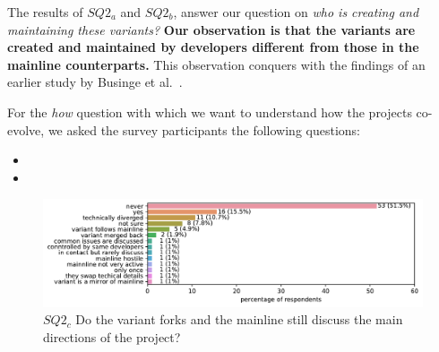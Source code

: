 The results of $SQ2_{a}$ and $SQ2_{b}$, answer our question on \textit{who is creating and maintaining these variants?} \textbf{Our observation is that the variants are created and maintained by developers different from those in the mainline counterparts.} This observation conquers with the findings of an earlier study by Businge et al.~\cite{businge:emse:2021}.


For the \textit{how} question with which we want to understand how the projects co-evolve, we asked the survey participants the following questions:
\begin{itemize}
\item \rqTwoThree
\item   \rqTwoFour
\end{itemize}


\begin{figure}[ht]
\begin{center}
    \centering
    \includegraphics[width=\columnwidth]{pdfs/discussions_rq3_colored.pdf}
    \caption{$SQ2_{c}$ Do the variant forks and the mainline still discuss the main directions of the project?}
    \label{fig:discussions}
\end{center}
\vspace{-.3cm}
\end{figure}

